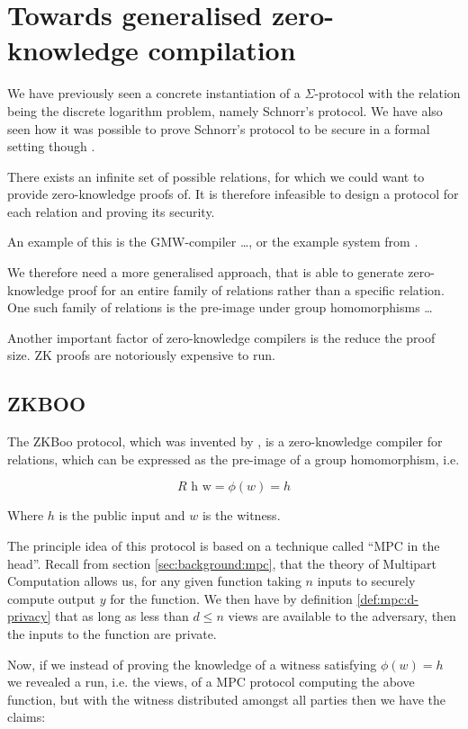 \chapter{Towards generalised zero-knowledge compilation}
\label{ch:general_zk}
We have previously seen a concrete instantiation of a $\Sigma$-protocol with the
relation being the discrete logarithm problem, namely Schnorr's protocol. We
have also seen how it was possible to prove Schnorr's protocol to be secure in a
formal setting though \easycrypt.

There exists an infinite set of possible relations, for which we could want to
provide zero-knowledge proofs of. It is therefore infeasible to design a
protocol for each relation and proving its security.

An example of this is the GMW-compiler \dots, or the example system from \cite{zkcrypt}.

We therefore need a more generalised approach, that is able to generate
zero-knowledge proof for an entire family of relations rather than a specific relation.
One such family of relations is the pre-image under group homomorphisms \dots

Another important factor of zero-knowledge compilers is the reduce the proof
size. ZK proofs are notoriously expensive to run.

\section{ZKBOO}
\label{sec:zkboo}
The ZKBoo protocol, which was invented by \citet{zkboo}, is a zero-knowledge compiler for relations, which can be
expressed as the pre-image of a group homomorphism, i.e.


\[
  R \text{ h w} = \phi(w) = h
\]

Where $h$ is the public input and $w$ is the witness.

The principle idea of this protocol is based on a technique called ``MPC in the
head''. Recall from section \ref{sec:background:mpc}, that the theory of
Multipart Computation allows us, for any given function taking $n$ inputs to
securely compute output $y$ for the function. We then have by definition
\ref{def:mpc:d-privacy} that as long as less than $d \leq n$ views are available to the adversary, then the inputs to the function are private.

Now, if we instead of proving the knowledge of a witness satisfying $\phi(w) = h$
we revealed a run, i.e. the views, of a MPC protocol computing the above
function, but with the witness distributed amongst all parties then we have the
claims:


